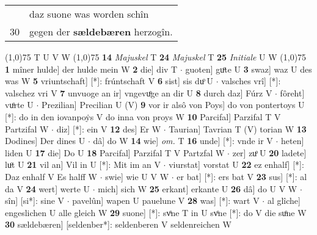 \documentclass[8pt,a4paper,notitlepage]{article}
\begin{document}
\begin{table}[ht]
\begin{minipage}[t]{0.5\linewidth}
\begin{tabular}{rl}
 & daz suone was worden schîn\\ 
30 & gegen der \textbf{sældebæren} herzogîn.\\ 
\end{tabular}
\scriptsize
\line(1,0){75} \newline
T U V W \newline
\line(1,0){75} \newline
\textbf{14} \textit{Majuskel} T  \textbf{24} \textit{Majuskel} T  \textbf{25} \textit{Initiale} U W  \newline
\line(1,0){75} \newline
\textbf{1} mîner hulde] der hulde mein W \textbf{2} die] div T  $\cdot$ guoten] guͦte U \textbf{3} swaz] waz U des was W \textbf{5} vriuntschaft] [*]: frúntschaft V \textbf{6} sist] sis duͦ U  $\cdot$ valsches vrî] [*]: valschez vri V \textbf{7} unvuoge an ir] vngevuͦge an dir U \textbf{8} durch daz] Fúrz V  $\cdot$ fôreht] vuͦrte U  $\cdot$ Prezilian] Precilian U (V) \textbf{9} vor ir alsô von Poys] do von pontertoys U [*]: do in den iovanpoẏs V do inna von proys W \textbf{10} Parcifal] Parzifal T V Partzifal W  $\cdot$ diz] [*]: ein V \textbf{12} des] Er W  $\cdot$ Taurian] Tavrian T (V) torian W \textbf{13} Dodines] Der dines U  $\cdot$ dâ] do W \textbf{14} wie] \textit{om.} T \textbf{16} unde] [*]: vnde ir V  $\cdot$ heten] liden U \textbf{17} die] Do U \textbf{18} Parcifal] Parzifal T V Partzfal W  $\cdot$ zer] zuͦ U \textbf{20} ladete] luͦt U \textbf{21} vil an] Vil in U [*]: Mit im an V  $\cdot$ viurstat] vorstat U \textbf{22} ez enhalf] [*]: Daz enhalf V Es halff W  $\cdot$ swie] wie U V W  $\cdot$ er bat] [*]: ers bat V \textbf{23} sus] [*]: al da V \textbf{24} wert] werte U  $\cdot$ mich] sich W \textbf{25} erkant] erkante U \textbf{26} dâ] do U V W  $\cdot$ sîn] [si*]: sine V  $\cdot$ pavelûn] wapen U pauelune V \textbf{28} was] [*]: wart V  $\cdot$ al glîche] engeslichen U alle gleich W \textbf{29} suone] [*]: svͦne T in U svͦne [*]: do V die suͦne W \textbf{30} sældebæren] [seldenber*]: seldenberen V seldenreichen W \newline
\end{minipage}
\end{table}
\end{document}
